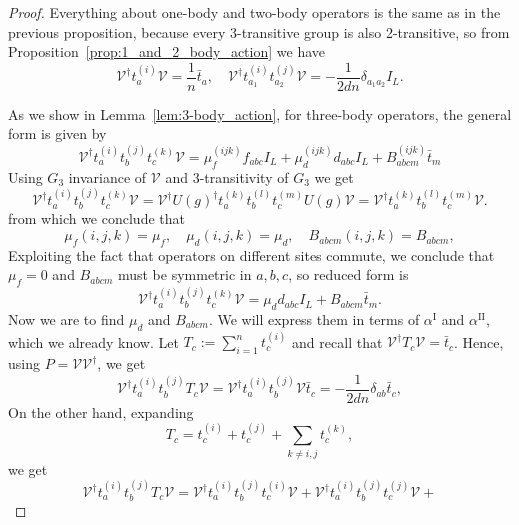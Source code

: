 \documentclass[11pt,letterpaper]{article}
\theoremstyle{plain}
\theoremstyle{plain}
\theoremstyle{plain}
\theoremstyle{plain}
\theoremstyle{plain}
\theoremstyle{plain}
\theoremstyle{plain}
\theoremstyle{definition}
\theoremstyle{plain}
\begin{document}
\begin{proof}
    Everything about one-body and two-body operators is the same as in the previous proposition, 
    because every 3-transitive group is also 2-transitive, so from Proposition~\ref{prop:1_and_2_body_action} we have
    \begin{equation}\label{eq:VtaV_and_Vta_tbV}
        \mathcal{V}^{\dagger} t^{(i)}_a \mathcal{V}=\frac{1}{n} \bar{t}_a, \quad \mathcal{V}^{\dagger} t_{a_1}^{(i)} t_{a_2}^{(j)} \mathcal{V}=-\frac{1}{2 d n} \delta_{a_1 a_2} I_L.
    \end{equation}

    As we show in Lemma~\ref{lem:3-body_action}, for three-body operators, the general form is given by
    \[
        \mathcal{V}^{\dagger} t_a^{(i)} t_b^{(j)} t_c^{(k)} \mathcal{V}=\mu_f^{(i j k)} f_{a b c} I_L+\mu_d^{(i j k)} d_{a b c} I_L+B_{a b c m}^{(i j k)} \bar{t}_m
    \]
    Using $G_3$ invariance of $\mathcal{V}$ and $3$-transitivity of $G_3$ we get
    \[
        \mathcal{V}^{\dagger} t_a^{(i)} t_b^{(j)} t_c^{(k)}  \mathcal{V}=\mathcal{V}^{\dagger} U(g)^{\dagger} t_a^{(k)} t_b^{(l)} t_c^{(m)} U(g) \mathcal{V}
        =\mathcal{V}^{\dagger} t_a^{(k)} t_b^{(l)} t_c^{(m)} \mathcal{V} .
    \]
    from which we conclude that
    \[
        \mu_f(i, j, k)=\mu_f, \quad \mu_d(i, j, k)=\mu_d, \quad B_{a b c m}(i, j, k)=B_{a b c m},
    \]
    Exploiting the fact that operators on different sites commute, we conclude that $\mu_f=0$ and $B_{a b c m}$ must be symmetric in $a, b, c$,
    so reduced form is
    \[
    \mathcal{V}^{\dagger} t_a^{(i)} t_b^{(j)} t_c^{(k)} \mathcal{V}=\mu_d d_{a b c} I_L+B_{a b c m}\bar{t}_m.
    \]
    Now we are to find $\mu_d$ and $B_{a b c m}$. We will express them in terms of $\alpha^{\text{I}}$ and $\alpha^{\text{II}}$, which we already know. 
    Let
    $
        T_c:=\sum_{i=1}^n t_c^{(i)}
    $
    and recall that $\mathcal{V}^{\dagger} T_c \mathcal{V}=\bar{t}_c$. Hence, using $P=\mathcal{V}\mathcal{V}^{\dagger}$, we get
    \begin{equation}\label{eq:Vta_tbT_cVR}
        \mathcal{V}^{\dagger} t_a^{(i)} t_b^{(j)} T_c \mathcal{V}=\mathcal{V}^{\dagger} t_a^{(i)} t_b^{(j)} \mathcal{V} \bar{t}_c =-\frac{1}{2 d n} \delta_{a b} \bar{t}_c,
    \end{equation}
    On the other hand, expanding
    \[
        T_c=t_c^{(i)}+t_c^{(j)}+\sum_{k \neq i, j} t_c^{(k)},
    \]
    we get
    \begin{equation}\label{eq:Vta_tbT_cVL}
        \mathcal{V}^{\dagger} t_a^{(i)} t_b^{(j)} T_c \mathcal{V}=\mathcal{V}^{\dagger} t_a^{(i)} t_b^{(j)} t_c^{(i)} \mathcal{V}+\mathcal{V}^{\dagger} t_a^{(i)} t_b^{(j)} t_c^{(j)} \mathcal{V}+

\end{equation}
\end{proof}
\end{document}
